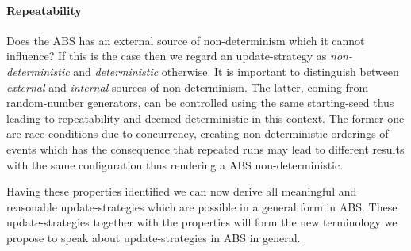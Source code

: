\paragraph{Repeatability}
Does the ABS has an external source of non-determinism which it cannot influence? If this is the case then we regard an update-strategy as \textit{non-deterministic} and \textit{deterministic} otherwise. It is important to distinguish between \textit{external} and \textit{internal} sources of non-determinism. The latter, coming from random-number generators, can be controlled using the same starting-seed thus leading to repeatability and deemed deterministic in this context. The former one are race-conditions due to concurrency, creating non-deterministic orderings of events which has the consequence that repeated runs may lead to different results with the same configuration thus rendering a ABS non-deterministic.

\medskip

Having these properties identified we can now derive all meaningful and reasonable update-strategies which are possible in a general form in ABS. These update-strategies together with the properties will form the new terminology we propose to speak about update-strategies in ABS in general.